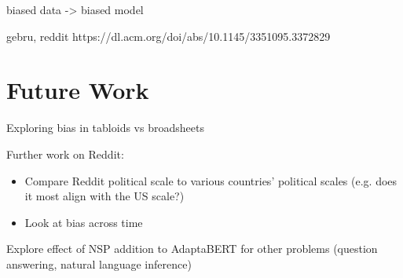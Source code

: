 biased data -> biased model

gebru, reddit
https://dl.acm.org/doi/abs/10.1145/3351095.3372829


\section{Future Work}

Exploring bias in tabloids vs broadsheets

Further work on Reddit:
\begin{itemize}
    \item Compare Reddit political scale to various countries' political scales (e.g. does it most align with the US scale?)
    \item Look at bias across time
\end{itemize}

Explore effect of NSP addition to AdaptaBERT for other problems (question answering, natural language inference)

